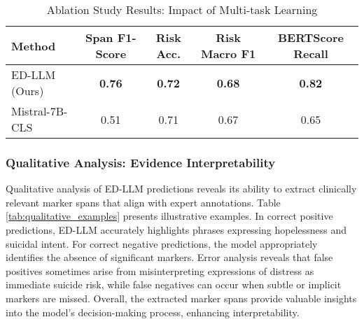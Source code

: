 \begin{table*}[t]
    \centering
    \caption{Ablation Study Results: Impact of Multi-task Learning}
    \label{tab:ablation_results}
    \begin{tabular}{lcccc}
        \toprule
        \textbf{Method} & \textbf{Span F1-Score} & \textbf{Risk Acc.} & \textbf{Risk Macro F1} & \textbf{BERTScore Recall} \\
        \midrule
        ED-LLM (Ours) & \textbf{0.76} & \textbf{0.72} & \textbf{0.68} & \textbf{0.82} \\
        Mistral-7B-CLS & 0.51 & 0.71 & 0.67 & 0.65 \\
        \bottomrule
    \end{tabular}
\end{table*}

\subsubsection{Qualitative Analysis: Evidence Interpretability}

Qualitative analysis of ED-LLM predictions reveals its ability to extract clinically relevant marker spans that align with expert annotations. Table \ref{tab:qualitative_examples} presents illustrative examples. In correct positive predictions, ED-LLM accurately highlights phrases expressing hopelessness and suicidal intent. For correct negative predictions, the model appropriately identifies the absence of significant markers. Error analysis reveals that false positives sometimes arise from misinterpreting expressions of distress as immediate suicide risk, while false negatives can occur when subtle or implicit markers are missed. Overall, the extracted marker spans provide valuable insights into the model's decision-making process, enhancing interpretability.

